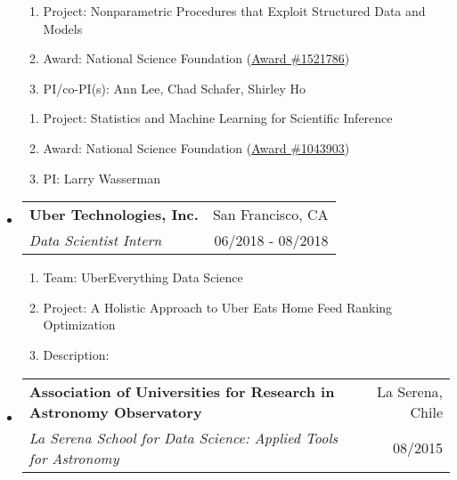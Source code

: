 \documentclass[letterpaper,10pt]{article}
\makeatletter
\newcommand{\subheadingtwo}[4]{
\begin{tabular*}{6.45in}{l@{\cftdotfill{\cftsecdotsep}\extracolsep{\fill}}r}
\textbf{#1} & #2 \\
#3 & {#4} \\
\end{tabular*}}
\makeatother
\begin{document}
\begin{itemize}[leftmargin=0.4cm]
\begin{enumerate}[leftmargin=0.5cm]
	\setlength\itemsep{-0.05ex}
	\item[] Project: Nonparametric Procedures that Exploit Structured Data and Models 
	\item[] Award: National Science Foundation (\href{https://www.nsf.gov/awardsearch/showAward?AWD_ID=1521786}{Award \#1521786})
	\item[] PI/co-PI(s): Ann Lee, Chad Schafer, Shirley Ho
\end{enumerate}


\begin{enumerate}[leftmargin=0.5cm]
	\setlength\itemsep{-0.05ex}
	\item[] Project: Statistics and Machine Learning for Scientific Inference
	\item[] Award: National Science Foundation (\href{https://www.nsf.gov/awardsearch/showAward?AWD_ID=1043903&HistoricalAwards=false}{Award \#1043903})
	\item[] PI: Larry Wasserman
\end{enumerate}


\vspace{0.1cm}


\item[] \subheadingtwo{Uber Technologies, Inc.}{San Francisco, CA}{\it Data Scientist Intern}{06/2018 - 08/2018}


\begin{enumerate}[leftmargin=0.5cm]
	\setlength\itemsep{-0.05ex}
	\item[] Team: UberEverything Data Science
	\item[] Project: A Holistic Approach to Uber Eats Home Feed Ranking Optimization
	\item[] Description:
\vspace{-0.1cm}
{}
\end{enumerate}


\vspace{0.1cm}


\item[] \subheadingtwo{Association of Universities for Research in Astronomy Observatory}{La Serena, Chile}{\it La Serena School for Data Science: Applied Tools for Astronomy}{08/2015}


\end{itemize}
\end{document}
